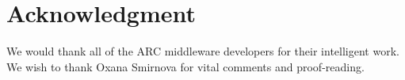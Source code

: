 \documentclass[conference]{IEEEtran}
\begin{document}
\section*{Acknowledgment}
We would thank all of the ARC middleware developers for
their intelligent work. We wish to thank Oxana Smirnova for
vital comments and proof-reading.




%
\end{document}
